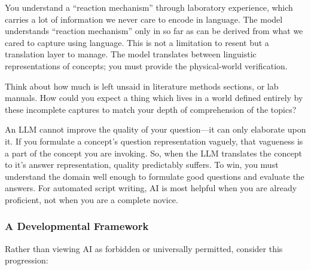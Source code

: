 You understand a ``reaction mechanism'' through laboratory experience, which carries a lot of information we never care to encode in language. The model understands ``reaction mechanism'' only in so far as can be derived from what we cared to capture using language. This is not a limitation to resent but a translation layer to manage. The model translates between linguistic representations of concepts; you must provide the physical-world verification.

\begin{ponder}
Think about how much is left unsaid in literature methods sections, or lab manuals. How could you expect a thing which lives in a world defined entirely by these incomplete captures to match your depth of comprehension of the topics?
\end{ponder}

\begin{warning}
An LLM cannot improve the quality of your question---it can only elaborate upon it. If you formulate a concept's question representation vaguely, that vagueness is a part of the concept you are invoking. So, when the LLM translates the concept to it's answer representation, quality predictably suffers. To win, you must understand the domain well enough to formulate good questions and evaluate the answers. For automated script writing, AI is most helpful when you are already proficient, not when you are a complete novice.
\end{warning}

\subsubsection*{A Developmental Framework}

Rather than viewing AI as forbidden or universally permitted, consider this progression:


